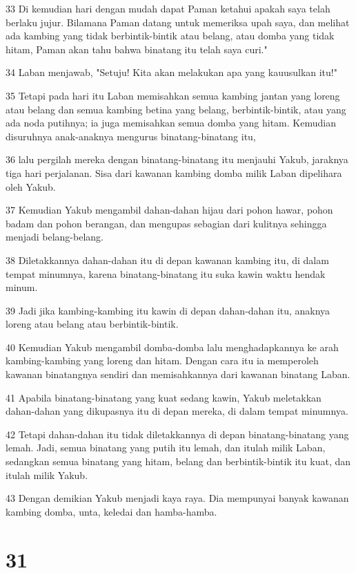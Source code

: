 \par 33 Di kemudian hari dengan mudah dapat Paman ketahui apakah saya telah berlaku jujur. Bilamana Paman datang untuk memeriksa upah saya, dan melihat ada kambing yang tidak berbintik-bintik atau belang, atau domba yang tidak hitam, Paman akan tahu bahwa binatang itu telah saya curi."
\par 34 Laban menjawab, "Setuju! Kita akan melakukan apa yang kauusulkan itu!"
\par 35 Tetapi pada hari itu Laban memisahkan semua kambing jantan yang loreng atau belang dan semua kambing betina yang belang, berbintik-bintik, atau yang ada noda putihnya; ia juga memisahkan semua domba yang hitam. Kemudian disuruhnya anak-anaknya mengurus binatang-binatang itu,
\par 36 lalu pergilah mereka dengan binatang-binatang itu menjauhi Yakub, jaraknya tiga hari perjalanan. Sisa dari kawanan kambing domba milik Laban dipelihara oleh Yakub.
\par 37 Kemudian Yakub mengambil dahan-dahan hijau dari pohon hawar, pohon badam dan pohon berangan, dan mengupas sebagian dari kulitnya sehingga menjadi belang-belang.
\par 38 Diletakkannya dahan-dahan itu di depan kawanan kambing itu, di dalam tempat minumnya, karena binatang-binatang itu suka kawin waktu hendak minum.
\par 39 Jadi jika kambing-kambing itu kawin di depan dahan-dahan itu, anaknya loreng atau belang atau berbintik-bintik.
\par 40 Kemudian Yakub mengambil domba-domba lalu menghadapkannya ke arah kambing-kambing yang loreng dan hitam. Dengan cara itu ia memperoleh kawanan binatangnya sendiri dan memisahkannya dari kawanan binatang Laban.
\par 41 Apabila binatang-binatang yang kuat sedang kawin, Yakub meletakkan dahan-dahan yang dikupasnya itu di depan mereka, di dalam tempat minumnya.
\par 42 Tetapi dahan-dahan itu tidak diletakkannya di depan binatang-binatang yang lemah. Jadi, semua binatang yang putih itu lemah, dan itulah milik Laban, sedangkan semua binatang yang hitam, belang dan berbintik-bintik itu kuat, dan itulah milik Yakub.
\par 43 Dengan demikian Yakub menjadi kaya raya. Dia mempunyai banyak kawanan kambing domba, unta, keledai dan hamba-hamba.

\chapter{31}

